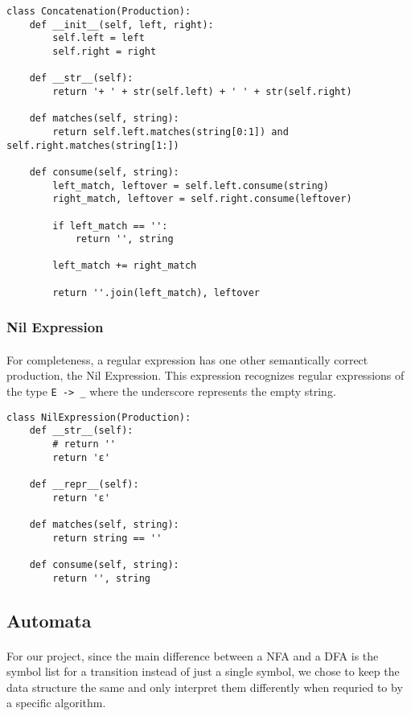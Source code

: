 \documentclass{article}
\begin{document}
\begin{verbatim}
class Concatenation(Production):
    def __init__(self, left, right):
        self.left = left
        self.right = right
    
    def __str__(self):
        return '+ ' + str(self.left) + ' ' + str(self.right)

    def matches(self, string):
        return self.left.matches(string[0:1]) and self.right.matches(string[1:])
    
    def consume(self, string):
        left_match, leftover = self.left.consume(string)
        right_match, leftover = self.right.consume(leftover)

        if left_match == '':
            return '', string
 
        left_match += right_match

        return ''.join(left_match), leftover
\end{verbatim}

\subsubsection{Nil Expression}
\paragraph{} For completeness, a regular expression has one other 
semantically correct production, the Nil Expression. This expression
recognizes regular expressions of the type \verb|E -> _| where the
underscore represents the empty string.

\begin{verbatim}
class NilExpression(Production):
    def __str__(self):
        # return ''
        return 'ε'

    def __repr__(self):
        return 'ε'

    def matches(self, string):
        return string == ''

    def consume(self, string):
        return '', string
\end{verbatim}

\subsection{Automata}
\paragraph{} For our project, since the main difference between
a NFA and a DFA is the symbol list for a transition instead of just a
single symbol, we chose to keep the data structure the same and only
interpret them differently when requried to by a specific algorithm.
\end{document}
